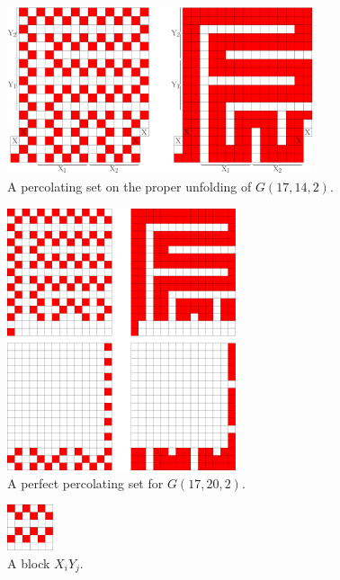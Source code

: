 \begin{figure}[]
\centering
\includegraphics[width=0.8\textwidth]{figures/7/18x16x1_unfolded_lethal.pdf}
\caption{A percolating set on the proper unfolding of $G(17,14,2)$.}
\label{fig:18x16x1_unfolded_lethal}
\end{figure}

\begin{figure}[]
\centering
\includegraphics[width=0.6\textwidth]{figures/7/17x14x2.pdf}
\caption{A perfect percolating set for $G(17,20,2)$.}
\label{fig:11x20x2}
\end{figure} 

\begin{figure}[]
\centering
\includegraphics[width=0.12\textwidth]{figures/7/XiYj.pdf}
\caption{A block $X_iY_j$.}
\label{fig:XiYj}
\end{figure} 


